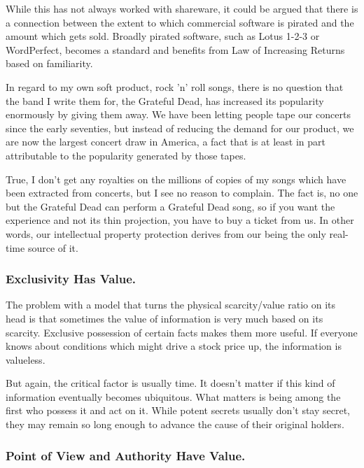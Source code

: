 \documentclass[
]{article}
\begin{document}
While this has not always worked with shareware, it could be argued that
there is a connection between the extent to which commercial software is
pirated and the amount which gets sold. Broadly pirated software, such
as Lotus 1-2-3 or WordPerfect, becomes a standard and benefits from Law
of Increasing Returns based on familiarity.

In regard to my own soft product, rock 'n' roll songs, there is no
question that the band I write them for, the Grateful Dead, has
increased its popularity enormously by giving them away. We have been
letting people tape our concerts since the early seventies, but instead
of reducing the demand for our product, we are now the largest concert
draw in America, a fact that is at least in part attributable to the
popularity generated by those tapes.

True, I don't get any royalties on the millions of copies of my songs
which have been extracted from concerts, but I see no reason to
complain. The fact is, no one but the Grateful Dead can perform a
Grateful Dead song, so if you want the experience and not its thin
projection, you have to buy a ticket from us. In other words, our
intellectual property protection derives from our being the only
real-time source of it.

\hypertarget{header-n299}{%
\subsubsection{Exclusivity Has Value.}\label{header-n299}}

The problem with a model that turns the physical scarcity/value ratio on
its head is that sometimes the value of information is very much based
on its scarcity. Exclusive possession of certain facts makes them more
useful. If everyone knows about conditions which might drive a stock
price up, the information is valueless.

But again, the critical factor is usually time. It doesn't matter if
this kind of information eventually becomes ubiquitous. What matters is
being among the first who possess it and act on it. While potent secrets
usually don't stay secret, they may remain so long enough to advance the
cause of their original holders.

\hypertarget{header-n302}{%
\subsubsection{Point of View and Authority Have
Value.}\label{header-n302}}
\end{document}
